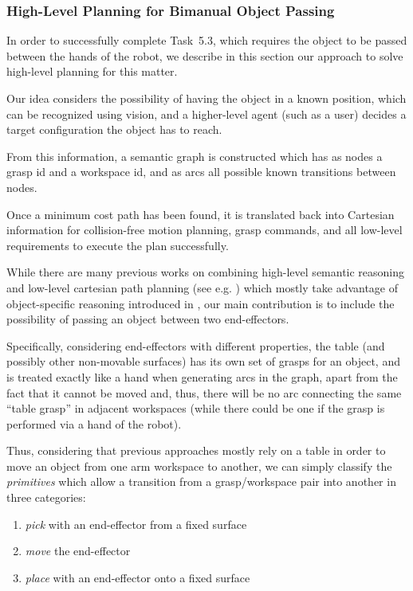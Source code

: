 
\subsubsection{High-Level Planning for Bimanual Object Passing}
\label{sec:HighLevelPlanningDualArm}

In order to successfully complete Task~5.3, which requires the object to be passed between the hands of the robot, we describe in this section our approach to solve high-level planning for this matter.

Our idea considers the possibility of having the object in a known position, which can be recognized using vision, and a higher-level agent (such as a user) decides a target configuration the object has to reach.

From this information, a semantic graph is constructed which has as nodes a grasp id and a workspace id, and as arcs all possible known transitions between nodes.

Once a minimum cost path has been found, it is translated back into Cartesian information for collision-free motion planning, grasp commands, and all low-level requirements to execute the plan successfully.

While there are many previous works on combining high-level semantic reasoning and low-level cartesian path planning (see e.g. \cite{karlsson2012combining, leidner2012things, leidner2013hybrid}) which mostly take advantage of object-specific reasoning introduced in \cite{levison1996connecting}, our main contribution is to include the possibility of passing an object between two end-effectors.

Specifically, considering end-effectors with different properties, the table (and possibly other non-movable surfaces) has its own set of grasps for an object, and is treated exactly like a hand when generating arcs in the graph, apart from the fact that it cannot be moved and, thus, there will be no arc connecting the same ``table grasp'' in adjacent workspaces (while there could be one if the grasp is performed via a hand of the robot).

Thus, considering that previous approaches mostly rely on a table in order to move an object from one arm workspace to another, we can simply classify the \emph{primitives} which allow a transition from a grasp/workspace pair into another in three categories:
\begin{enumerate}
	\item \emph{pick} with an end-effector from a fixed surface
	\item \emph{move} the end-effector
	\item \emph{place} with an end-effector onto a fixed surface
\end{enumerate}

